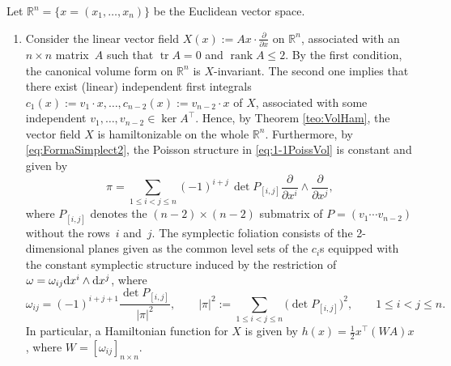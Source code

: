 \documentclass[10pt,a4paper]{amsart}
\newcommand{\R}[1]{\mathbb{R}^{#1}}
\newcommand{\dd}{{\rm d}}
\numberwithin{equation}{section}
\begin{document}
\begin{Example}%
Let $\R{n} = \{x = (x_{1}, \dots, x_{n})\}$ be the Euclidean vector space.
\begin{enumerate}\itemsep=0pt
 \item Consider the linear vector field $X(x) := Ax \cdot \frac{\partial}{\partial x}$ on $\R{n}$, associated with an $n \times n$ mat\-rix~$A$ such that $\operatorname{tr}A = 0$ and $\operatorname{rank}A \leq 2$. By the first condition, the canonical volume form on $\R{n}$ is $X$-invariant. The second one implies that there exist (linear) independent first integrals $c_1(x) := v_1 \cdot x, \dots, c_{n-2}(x) := v_{n-2} \cdot x$ of $X$, associated with some independent $v_1, \dots, v_{n-2} \in \ker{A^{\top}}$. Hence, by Theorem \ref{teo:VolHam}, the vector field $X$ is hamiltonizable on the whole $\R{n}$. Furthermore, by \eqref{eq:FormaSimplect2}, the Poisson structure in \eqref{eq:1-1PoissVol} is constant and given by
 \begin{equation}\label{EcPpoisson}
 \pi = \sum_{1 \leq i < j \leq n} (-1)^{i+j}\,\det{P_{[i,j]}} \frac{\partial}{\partial{x^{i}}} \wedge \frac{\partial}{\partial{x^{j}}},
 \end{equation}
 where $P_{[i,j]}$ denotes the $(n-2) \times (n-2)$ submatrix of $P=(v_{1} \cdots v_{n-2})$ without the rows~$i$ and~$j$. The symplectic foliation consists of the 2-dimensional planes given as the common level sets of the $c_i$s equipped with the constant symplectic structure induced by the restriction of $\omega = \omega_{ij}\dd{x^{i}} \wedge \dd{x^{j}}$, where
 \begin{equation}\label{EcPformaSym}
 \omega_{ij} = (-1)^{i+j+1} \frac{\det{P_{[i,j]}}}{|\pi|^{2}}, \qquad
 |\pi|^{2} := \!\!\sum_{1 \leq i < j \leq n}\!\!\big(\det{P_{[i,j]}}\big)^{2}, \qquad
 1 \leq i < j \leq n.
 \end{equation}
 In particular, a Hamiltonian function for $X$ is given by $h(x) = \frac{1}{2}x^{\top}(WA)x$, where $W=[\omega_{ij}]_{n \times n}$.


\end{enumerate}
\end{Example}
\end{document}

